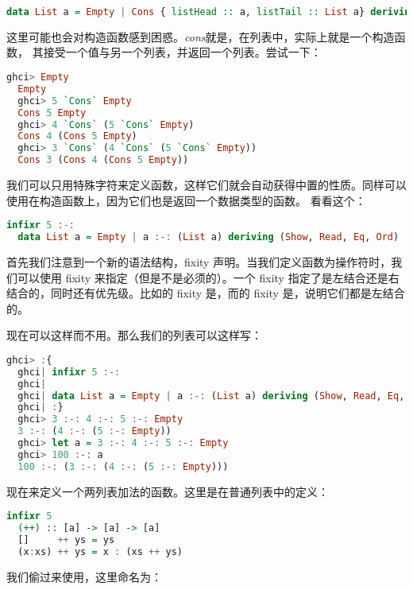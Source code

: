 \documentclass[./main.tex]{subfiles}
\begin{document}
\begin{lstlisting}[language=Haskell]
  data List a = Empty | Cons { listHead :: a, listTail :: List a} deriving (Show, Read, Eq, Ord)
\end{lstlisting}

这里可能也会对构造函数感到困惑。\textit{cons}就是\acode{:}，在列表中，\acode{:}实际上就是一个构造函数，
其接受一个值与另一个列表，并返回一个列表。尝试一下：

\begin{lstlisting}[language=Haskell]
  ghci> Empty
  Empty
  ghci> 5 `Cons` Empty
  Cons 5 Empty
  ghci> 4 `Cons` (5 `Cons` Empty)
  Cons 4 (Cons 5 Empty)
  ghci> 3 `Cons` (4 `Cons` (5 `Cons` Empty))
  Cons 3 (Cons 4 (Cons 5 Empty))
\end{lstlisting}

我们可以只用特殊字符来定义函数，这样它们就会自动获得中置的性质。同样可以使用在构造函数上，因为它们也是返回一个数据类型的函数。
看看这个：

\begin{lstlisting}[language=Haskell]
  infixr 5 :-:
  data List a = Empty | a :-: (List a) deriving (Show, Read, Eq, Ord)
\end{lstlisting}

首先我们注意到一个新的语法结构，fixity 声明。当我们定义函数为操作符时，我们可以使用 fixity 来指定（但是不是必须的）。一个
fixity 指定了是左结合还是右结合的，同时还有优先级。比如\acode{*}的 fixity 是，而\acode{+}的
fixity 是，说明它们都是左结合的。

现在可以这样而不用。那么我们的列表可以这样写：

\begin{lstlisting}[language=Haskell]
  ghci> :{
  ghci| infixr 5 :-:
  ghci|
  ghci| data List a = Empty | a :-: (List a) deriving (Show, Read, Eq, Ord)
  ghci| :}
  ghci> 3 :-: 4 :-: 5 :-: Empty
  3 :-: (4 :-: (5 :-: Empty))
  ghci> let a = 3 :-: 4 :-: 5 :-: Empty
  ghci> 100 :-: a
  100 :-: (3 :-: (4 :-: (5 :-: Empty)))
\end{lstlisting}

现在来定义一个两列表加法的函数。这里是\acode{++}在普通列表中的定义：

\begin{lstlisting}[language=Haskell]
  infixr 5
  (++) :: [a] -> [a] -> [a]
  []     ++ ys = ys
  (x:xs) ++ ys = x : (xs ++ ys)
\end{lstlisting}

我们偷过来使用，这里命名为：
\end{document}
